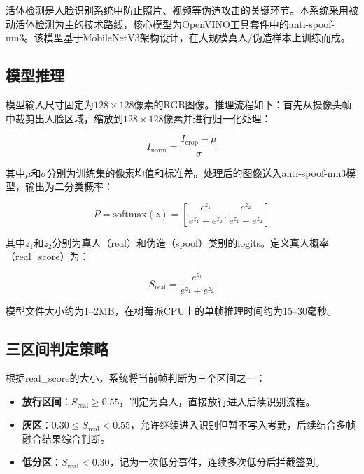 活体检测是人脸识别系统中防止照片、视频等伪造攻击的关键环节。本系统采用被动活体检测为主的技术路线，核心模型为OpenVINO工具套件中的anti-spoof-mn3\cite{silentface}。该模型基于MobileNetV3架构设计，在大规模真人/伪造样本上训练而成。

\subsection{模型推理}

模型输入尺寸固定为$128 \times 128$像素的RGB图像。推理流程如下：首先从摄像头帧中裁剪出人脸区域，缩放到$128 \times 128$像素并进行归一化处理：

\begin{equation}
    I_{\text{norm}} = \frac{I_{\text{crop}} - \mu}{\sigma}
\end{equation}

其中$\mu$和$\sigma$分别为训练集的像素均值和标准差。处理后的图像送入anti-spoof-mn3模型，输出为二分类概率：

\begin{equation}
    P = \text{softmax}(z) = \left[ \frac{e^{z_1}}{e^{z_1} + e^{z_2}}, \frac{e^{z_2}}{e^{z_1} + e^{z_2}} \right]
\end{equation}

其中$z_1$和$z_2$分别为真人（real）和伪造（spoof）类别的logits。定义真人概率（real\_score）为：

\begin{equation}
    S_{\text{real}} = \frac{e^{z_1}}{e^{z_1} + e^{z_2}}
\end{equation}

模型文件大小约为1--2MB，在树莓派CPU上的单帧推理时间约为15--30毫秒。

\subsection{三区间判定策略}

根据real\_score的大小，系统将当前帧判断为三个区间之一：

\begin{itemize}
    \item \textbf{放行区间}：$S_{\text{real}} \geq 0.55$，判定为真人，直接放行进入后续识别流程。
    \item \textbf{灰区}：$0.30 \leq S_{\text{real}} < 0.55$，允许继续进入识别但暂不写入考勤，后续结合多帧融合结果综合判断。
    \item \textbf{低分区}：$S_{\text{real}} < 0.30$，记为一次低分事件，连续多次低分后拦截签到。
\end{itemize}

